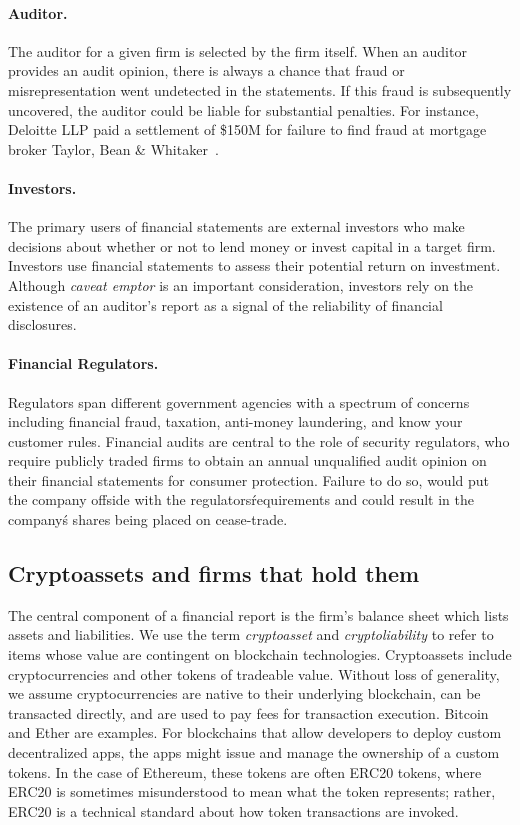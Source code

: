 \paragraph{Auditor.} The auditor for a given firm is selected by the firm itself. When an auditor provides an audit opinion, there is always a chance that fraud or misrepresentation went undetected in the statements. If this fraud is subsequently uncovered, the auditor could be liable for substantial penalties. For instance, Deloitte LLP paid a settlement of \$150M for failure to find fraud at mortgage broker Taylor, Bean \& Whitaker~\cite{FTDeloitte2018}.


\paragraph{Investors.} The primary users of financial statements are external investors who make decisions about whether or not to lend money or invest capital in a target firm. Investors use financial statements to assess their potential return on investment. Although \textit{caveat emptor} is an important consideration, investors rely on the existence of an auditor's report as a signal of the reliability of financial disclosures.
 
\paragraph{Financial Regulators.} Regulators span different government agencies with a spectrum of concerns including financial fraud, taxation, anti-money laundering, and know your customer rules. Financial audits are central to the role of security regulators, who require publicly traded firms to obtain an annual unqualified audit opinion on their financial statements for consumer protection. Failure to do so, would put the company offside with the regulators\' requirements and could result in the company\'s shares being placed on cease-trade. 


\subsection{Cryptoassets and firms that hold them}
The central component of a financial report is the firm’s balance sheet which lists assets and liabilities. We use the term \textit{cryptoasset} and \textit{cryptoliability} to refer to items whose value are contingent on blockchain technologies. Cryptoassets include cryptocurrencies and other tokens of tradeable value. Without loss of generality, we assume cryptocurrencies are native to their underlying blockchain, can be transacted directly, and are used to pay fees for transaction execution. Bitcoin and Ether are examples. For blockchains that allow developers to deploy custom decentralized apps, the apps might issue and manage the ownership of a custom tokens. In the case of Ethereum, these tokens are often ERC20 tokens, where ERC20 is sometimes misunderstood to mean what the token represents; rather, ERC20 is a technical standard about how token transactions are invoked.	


